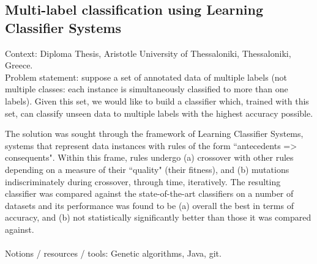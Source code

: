 \subsection{Multi-label classification using Learning Classifier Systems}

Context: Diploma Thesis, Aristotle University of Thessaloniki, Thessaloniki, Greece.\\

Problem statement: suppose a set of annotated data of multiple labels (not
multiple classes: each instance is simultaneously classified to more than one
labels). Given this set, we would like to build a classifier which, trained with
this set, can classify unseen data to multiple labels with the highest accuracy
possible.

The solution was sought through the framework of Learning Classifier Systems,
systems that represent data instances with rules of the form
``antecedents => consequents". Within this frame, rules undergo (a) crossover
with other rules depending on a measure of their ``quality" (their fitness),
and (b) mutations indiscriminately during crossover, through time, iteratively.
The resulting classifier was compared against the state-of-the-art classifiers
on a number of datasets and its performance was found to be (a) overall the best
in terms of accuracy, and (b) not statistically significantly better than those
it was compared against.\\\\
Notions / resources / tools: Genetic algorithms, Java, git.

